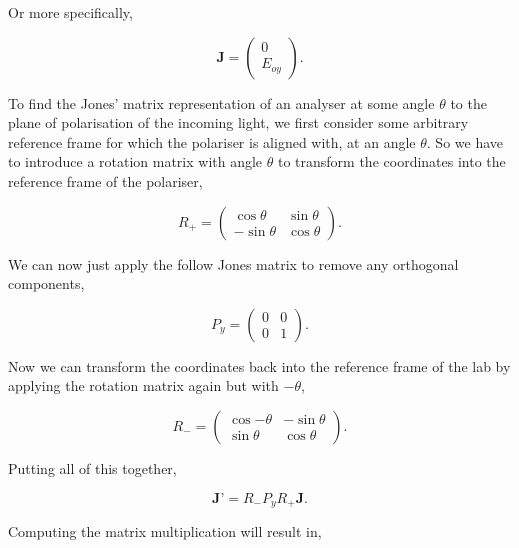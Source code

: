 \documentclass{article}
\begin{document}
Or more specifically,

\begin{equation} \label{eq:J}
    \textbf{J} =\begin{pmatrix}
        0 \\
        E_{oy}
    \end{pmatrix}.
\end{equation}

To find the Jones' matrix representation of an analyser at some angle 
$\theta$ to the plane of polarisation of the incoming light, we first 
consider some arbitrary reference frame for which the polariser is 
aligned with, at an angle $\theta$. So we have to introduce a rotation
matrix with angle $\theta$ to transform the coordinates into the reference 
frame of the polariser,

\begin{equation}
    \textbf{$R_+$} = \begin{pmatrix}
        \cos{\theta} & \sin{\theta} \\
        -\sin{\theta} & \cos{\theta}
    \end{pmatrix}.
\end{equation}

We can now just apply the follow Jones matrix to remove any orthogonal 
components,

\begin{equation}
    \textbf{$P_y$} = \begin{pmatrix}
        0 & 0 \\
        0 & 1
    \end{pmatrix}.
\end{equation}

Now we can transform the coordinates back into the reference frame of 
the lab by applying the rotation matrix again but with $-\theta$,

\begin{equation}
    \textbf{$R_-$} = \begin{pmatrix}
        \cos{-\theta} & -\sin{\theta} \\
        \sin{\theta} & \cos{\theta}
    \end{pmatrix}.
\end{equation}

Putting all of this together,

\begin{equation}
    \textbf{J'} = R_- P_y R_+ \textbf{J}.
\end{equation}

Computing the matrix multiplication will result in,
\end{document}
